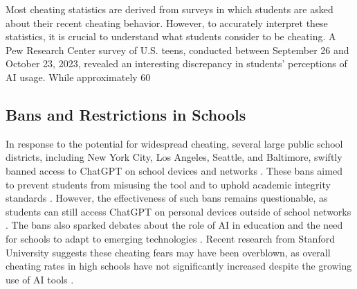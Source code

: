 \documentclass{article}
\begin{document}
Most cheating statistics are derived from surveys in which students are asked about their recent cheating behavior. However, to accurately interpret these statistics, it is crucial to understand what students consider to be cheating. A Pew Research Center survey of U.S. teens, conducted between September 26 and October 23, 2023, revealed an interesting discrepancy in students' perceptions of AI usage. While approximately 60%


\subsection{Bans and Restrictions in Schools}
In response to the potential for widespread cheating, several large public school districts, including New York City, Los Angeles, Seattle, and Baltimore, swiftly banned access to ChatGPT on school devices and networks \cite{https://oai.missouri.edu/chatgpt-artificial-intelligence-and-academic-integrity/} \cite{https://www.reddit.com/r/changemyview/comments/123m3xr/cmv_using_chatgpt_for_academic_purposes_is_not_an/}. These bans aimed to prevent students from misusing the tool and to uphold academic integrity standards \cite{https://oai.missouri.edu/chatgpt-artificial-intelligence-and-academic-integrity/}.
However, the effectiveness of such bans remains questionable, as students can still access ChatGPT on personal devices outside of school networks \cite{https://www.reddit.com/r/changemyview/comments/123m3xr/cmv_using_chatgpt_for_academic_purposes_is_not_an/}. The bans also sparked debates about the role of AI in education and the need for schools to adapt to emerging technologies \cite{https://oai.missouri.edu/chatgpt-artificial-intelligence-and-academic-integrity/} \cite{https://www.reddit.com/r/changemyview/comments/123m3xr/cmv_using_chatgpt_for_academic_purposes_is_not_an/}.
Recent research from Stanford University suggests these cheating fears may have been overblown, as overall cheating rates in high schools have not significantly increased despite the growing use of AI tools \cite{https://www.nytimes.com/2023/12/13/technology/chatbot-cheating-schools-students.html}.
\end{document}
